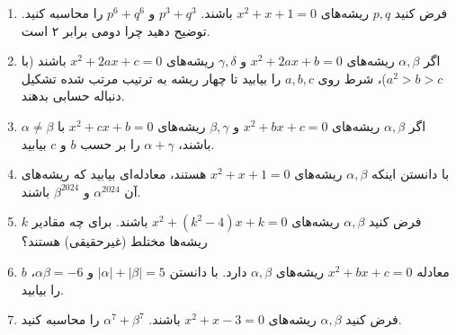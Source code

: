 \documentclass[12pt,a4paper]{article}
\begin{document}
\begin{enumerate}
\item فرض کنید $p, q$ ریشه‌های $x^2 + x + 1 = 0$ باشند. $p^3 + q^3$ و $p^6 + q^6$ را محاسبه کنید. توضیح دهید چرا دومی برابر ۲ است.
\item اگر $\alpha, \beta$ ریشه‌های $x^2 + 2ax + b = 0$ و $\gamma, \delta$ ریشه‌های $x^2 + 2ax + c = 0$ باشند (با $a^2 > b > c$)، شرط روی $a, b, c$ را بیابید تا چهار ریشه به ترتیب مرتب شده تشکیل دنباله حسابی بدهند.
\item اگر $\alpha, \beta$ ریشه‌های $x^2 + bx + c = 0$ و $\beta, \gamma$ ریشه‌های $x^2 + cx + b = 0$ با $\alpha \neq \beta$ باشند، $\alpha + \gamma$ را بر حسب $b$ و $c$ بیابید.
\item با دانستن اینکه $\alpha, \beta$ ریشه‌های $x^2 + x + 1 = 0$ هستند، معادله‌ای بیابید که ریشه‌های آن $\alpha^{2024}$ و $\beta^{2024}$ باشند.
\item فرض کنید $\alpha, \beta$ ریشه‌های $x^2 + (k^2 - 4)x + k = 0$ باشند. برای چه مقادیر $k$ ریشه‌ها مختلط (غیرحقیقی) هستند؟
\item معادله $x^2 + bx + c = 0$ ریشه‌های $\alpha, \beta$ دارد. با دانستن $|\alpha| + |\beta| = 5$ و $\alpha\beta = -6$، $b$ را بیابید.
\item فرض کنید $\alpha, \beta$ ریشه‌های $x^2 + x - 3 = 0$ باشند. $\alpha^7 + \beta^7$ را محاسبه کنید.
\end{enumerate}
\end{document}
